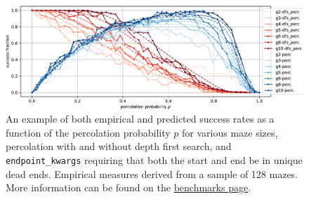 \begin{figure}
	\centering
	\includegraphics[width=1\textwidth,height=\textheight]{figures/ep/ep_deadends_unique-crop.pdf}
	\caption{An example of both empirical and predicted success rates as a
	function of the percolation probability \(p\) for various maze sizes,
	percolation with and without depth first search, and
	\texttt{endpoint\_kwargs} requiring that both the start and end be in
	unique dead ends. Empirical measures derived from a sample of 128 mazes.
	More information can be found on the
	\href{https://understanding-search.github.io/maze-dataset/benchmarks/}{benchmarks
	page}.}
\end{figure}